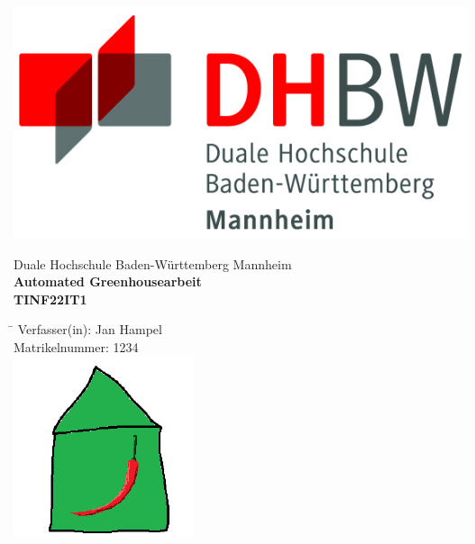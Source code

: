 \begin{titlepage}
    \begin{minipage}{\textwidth}
            \vspace{-2cm}
            \noindent \includegraphics[scale=0.5]{images/logo.jpg}
    \end{minipage}
    \vspace{1em}
    \begin{center}
        {\textsf{\large Duale Hochschule Baden-W\"urttemberg Mannheim}}\\[4em]
        {\textsf{\textbf{\large{Automated Greenhouse}arbeit}}}\\[6mm]
        {\textsf{\textbf{\large{}TINF22IT1}}}\\[4em]
        
        \begin{minipage}{\textwidth}
            \begin{tabbing}
             \hspace{0.85cm}\=\kill
            Verfasser(in):  Jan Hampel \\[1.5mm]
            Matrikelnummer:  1234 \\[4em]
    
            \noindent \includegraphics[scale=0.5]{images/GH_logo.png}
        
            \end{tabbing}
        \end{minipage}
    \end{center}
    \end{titlepage}